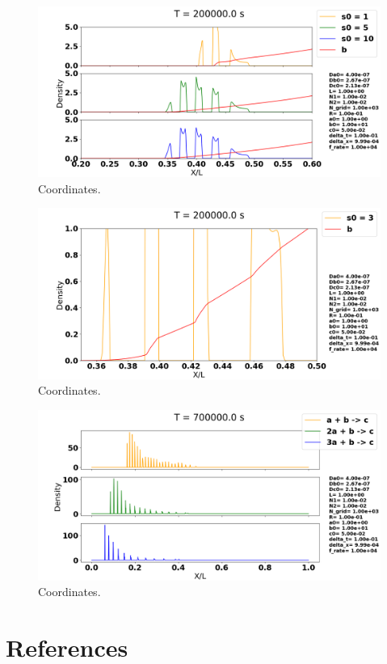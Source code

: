 \documentclass[1p]{elsarticle}        	%
\begin{document}
\begin{figure}
	\centering
	\includegraphics[width=\linewidth]{../figures/s0_1-10.png}
	\caption{Coordinates.}
	\label{fig:coords}
\end{figure}

\begin{figure}
	\centering
	\includegraphics[width=\linewidth]{../figures/s0_3.png}
	\caption{Coordinates.}
	\label{fig:coords}
\end{figure}

\begin{figure}
	\centering
	\includegraphics[width=\linewidth]{../figures/2a_s.png}
	\caption{Coordinates.}
	\label{fig:coords}
\end{figure}






\section*{References}

  
\end{document}
